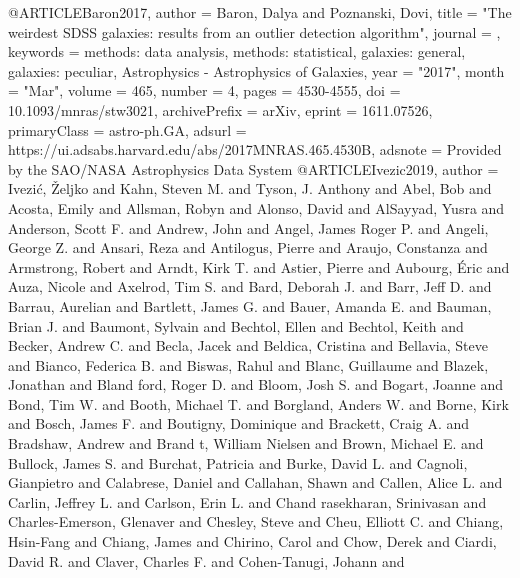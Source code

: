 @ARTICLE{Baron2017,
       author = {{Baron}, Dalya and {Poznanski}, Dovi},
        title = "{The weirdest SDSS galaxies: results from an outlier detection algorithm}",
      journal = {\mnras},
     keywords = {methods: data analysis, methods: statistical, galaxies: general, galaxies: peculiar, Astrophysics - Astrophysics of Galaxies},
         year = "2017",
        month = "Mar",
       volume = {465},
       number = {4},
        pages = {4530-4555},
          doi = {10.1093/mnras/stw3021},
archivePrefix = {arXiv},
       eprint = {1611.07526},
 primaryClass = {astro-ph.GA},
       adsurl = {https://ui.adsabs.harvard.edu/abs/2017MNRAS.465.4530B},
      adsnote = {Provided by the SAO/NASA Astrophysics Data System}
}
@ARTICLE{Ivezic2019,
       author = {{Ivezi{\'c}}, {\v{Z}}eljko and {Kahn}, Steven M. and
         {Tyson}, J. Anthony and {Abel}, Bob and {Acosta}, Emily and
         {Allsman}, Robyn and {Alonso}, David and {AlSayyad}, Yusra and
         {Anderson}, Scott F. and {Andrew}, John and {Angel}, James Roger P. and
         {Angeli}, George Z. and {Ansari}, Reza and {Antilogus}, Pierre and
         {Araujo}, Constanza and {Armstrong}, Robert and {Arndt}, Kirk T. and
         {Astier}, Pierre and {Aubourg}, {\'E}ric and {Auza}, Nicole and
         {Axelrod}, Tim S. and {Bard}, Deborah J. and {Barr}, Jeff D. and
         {Barrau}, Aurelian and {Bartlett}, James G. and {Bauer}, Amanda E. and
         {Bauman}, Brian J. and {Baumont}, Sylvain and {Bechtol}, Ellen and
         {Bechtol}, Keith and {Becker}, Andrew C. and {Becla}, Jacek and
         {Beldica}, Cristina and {Bellavia}, Steve and {Bianco}, Federica B. and
         {Biswas}, Rahul and {Blanc}, Guillaume and {Blazek}, Jonathan and {Bland
        ford}, Roger D. and {Bloom}, Josh S. and {Bogart}, Joanne and
         {Bond}, Tim W. and {Booth}, Michael T. and {Borgland}, Anders W. and
         {Borne}, Kirk and {Bosch}, James F. and {Boutigny}, Dominique and
         {Brackett}, Craig A. and {Bradshaw}, Andrew and {Brand
        t}, William Nielsen and {Brown}, Michael E. and {Bullock}, James S. and
         {Burchat}, Patricia and {Burke}, David L. and {Cagnoli}, Gianpietro and
         {Calabrese}, Daniel and {Callahan}, Shawn and {Callen}, Alice L. and
         {Carlin}, Jeffrey L. and {Carlson}, Erin L. and {Chand
        rasekharan}, Srinivasan and {Charles-Emerson}, Glenaver and
         {Chesley}, Steve and {Cheu}, Elliott C. and {Chiang}, Hsin-Fang and
         {Chiang}, James and {Chirino}, Carol and {Chow}, Derek and
         {Ciardi}, David R. and {Claver}, Charles F. and {Cohen-Tanugi}, Johann and
}}
